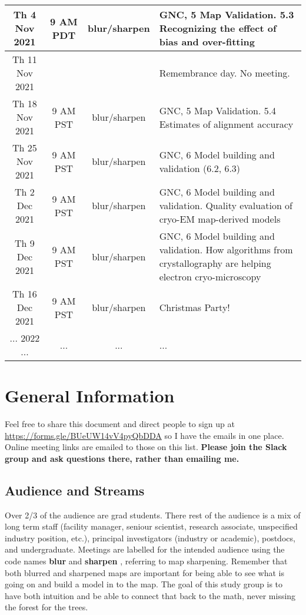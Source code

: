 \documentclass[11pt, oneside]{article}   	%
\begin{document}
\begin{center}
\begin{longtable}{|| c c c p{90mm} ||}
Th 4 Nov 2021& \tiny{9 AM PDT} & blur/sharpen &  \tiny{GNC, 5 Map Validation. 5.3 Recognizing the effect of bias and over-fitting} \\ 
 \hline %
Th 11 Nov 2021 & & & Remembrance day. No meeting.  \\ 
 \hline
 Th 18 Nov 2021 & \tiny{9 AM PST} & blur/sharpen &\tiny{GNC, 5 Map Validation. 5.4 Estimates of alignment accuracy}  \\ 
 \hline
Th 25 Nov 2021& \tiny{9 AM PST} & blur/sharpen & GNC, 6 Model building and validation (6.2, 6.3)  \\ 
 \hline
Th 2 Dec 2021 & \tiny{9 AM PST} & blur/sharpen &\tiny{GNC, 6 Model building and validation. \newline 6.4 Quality evaluation of cryo-EM map-derived models}\\ 
 \hline
Th 9 Dec 2021& \tiny{9 AM PST} & blur/sharpen &\tiny{GNC, 6 Model building and validation. \newline 6.5 How algorithms from crystallography are helping electron cryo-microscopy} \\ \hline
Th 16 Dec 2021& \tiny{9 AM PST} & blur/sharpen & Christmas Party! \\ 
[1ex]  
 \hline
 ... 2022 ... & ... &  ... & ...  \\ 
 \hline
\end{longtable}
\end{center}

\pagebreak
\section{General Information}

Feel free to share this document and direct people to sign up at \url{https://forms.gle/BUeUW14vV4pyQbDDA} so I have the emails in one place. Online meeting links are emailed to those on this list. {\bf Please join the Slack group and ask questions there, rather than emailing me.}

\subsection{Audience and Streams}
Over 2/3 of the audience are grad students. There rest of the audience is a mix of long term staff (facility manager, seniour scientist, research associate, unspecified industry position, etc.), principal investigators (industry or academic), postdocs, and undergraduate. Meetings are labelled for the intended audience using the code names {\bf blur} and {\bf sharpen} , referring to map sharpening. Remember that both blurred and sharpened maps are important for being able to see what is going on and build a model in to the map. The goal of this study group is to have both intuition and be able to connect that back to the math, never missing the forest for the trees.
\end{document}
